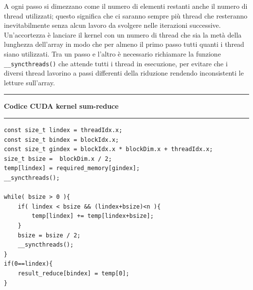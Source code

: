 \documentclass[12pt,a4paper]{report}
\begin{document}
\begin{figure}[H]
\centering
\begin{floatrow}[1]
\end{floatrow}
\end{figure} 
A ogni passo si dimezzano come il numero di elementi restanti anche il numero di thread utilizzati; questo significa che ci saranno sempre più thread che resteranno inevitabilmente senza alcun lavoro da svolgere nelle iterazioni successive. \newline
Un'accortezza è lanciare il kernel con un numero di thread che sia la metà della lunghezza dell'array in modo che per almeno il primo passo tutti quanti i thread siano utilizzati. \newline
Tra un passo e l'altro è necessario richiamare la funzione \verb|__syncthreads()| che attende tutti i thread in esecuzione, per evitare che i diversi thread lavorino a passi differenti della riduzione rendendo inconsistenti le letture sull'array.  \newpage
\noindent\rule[0.5ex]{\linewidth}{2pt}
\small{\textbf{Codice CUDA kernel sum-reduce}} \\
\noindent\rule[0.5ex]{\linewidth}{1pt}
\begin{lstlisting}
const size_t lindex = threadIdx.x;
const size_t bindex = blockIdx.x;
const size_t gindex = blockIdx.x * blockDim.x + threadIdx.x;
size_t bsize =  blockDim.x / 2;
temp[lindex] = required_memory[gindex];
__syncthreads();

while( bsize > 0 ){
    if( lindex < bsize && (lindex+bsize)<n ){
        temp[lindex] += temp[lindex+bsize];
    }
    bsize = bsize / 2;
    __syncthreads();
}
if(0==lindex){
    result_reduce[bindex] = temp[0];
} 
\end{lstlisting}
\end{document}
